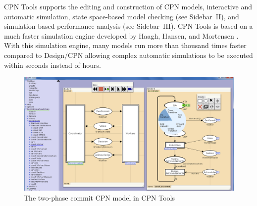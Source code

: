 CPN Tools supports the editing and construction of CPN models,
interactive and automatic simulation, state space-based model checking
(see Sidebar~II), and simulation-based performance analysis (see
Sidebar~III). CPN Tools is based on a much faster simulation engine
developed by Haagh, Hansen, and Mortensen \cite{mortensen:01}. With
this simulation engine, many models run more than thousand times
faster compared to Design/CPN allowing complex automatic simulations
to be executed within seconds instead of hours. 


\begin{figure}[t]
\centering
\includegraphics[scale=.36]{figures/cpntoolsnew.png}
\caption{The two-phase commit CPN model in CPN Tools}
\label{fig:cpntools}
\end{figure}

